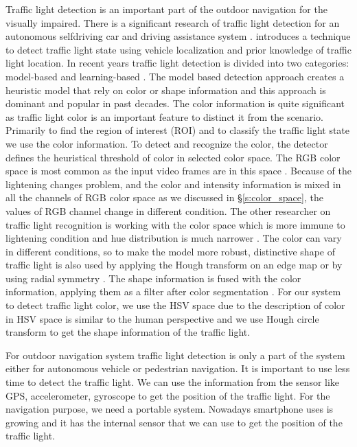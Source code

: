 Traffic light detection is an important part of the outdoor navigation for the visually impaired.
There is a significant research of traffic light detection for an autonomous selfdriving car and driving assistance system \cite{traffic_turan,selfdrive,traffic,traffic2,traffic3}.
\cite{traffic_turan} introduces a technique to detect traffic light state using vehicle localization and prior knowledge of traffic light location.
In recent years traffic light detection is divided into two categories: model-based and learning-based \cite{survey_traffic}.
The model based \cite{model,model2} detection approach creates a heuristic model that rely on color or shape information and this approach is dominant and popular in past decades.
The color information is quite significant as traffic light color is an important feature to distinct it from the scenario.
Primarily to find the region of interest (ROI) and to classify the traffic light state we use the color information.
To detect and recognize the color, the detector defines the heuristical threshold of color in selected color space.
The RGB color space is most common as the input video frames are in this space \cite{rgb2}.
Because of the lightening changes problem, and the color and intensity information is mixed in all the channels of  RGB color space as we discussed in \S\ref{s:color_space}, the values of RGB channel change in different condition.
The other researcher on traffic light recognition is working with the color space which is more immune to lightening condition and hue distribution is much narrower \cite{hsv2}.
The color can vary in different conditions, so to make the model more robust, distinctive shape of traffic light is also used by applying the Hough transform on an edge map \cite{hough,hough2,signalguru} or by using radial symmetry \cite{radial,radial2}.
The shape information is fused with the color information, applying them as a filter after color segmentation \cite{signalguru}.
For our system to detect traffic light color, we use the HSV space due to the description of color in HSV space is similar to the human perspective and we use Hough circle transform to get the shape information of the traffic light. 

For outdoor navigation system traffic light detection is only a part of the system either for autonomous vehicle or pedestrian navigation.
It is important to use less time to detect the traffic light.
We can use the information from the sensor like GPS, accelerometer, gyroscope to get the position of the traffic light. \cite{sensor,sensor2,sensor3}
For the navigation purpose, we need a portable system.
Nowadays smartphone uses is growing and it has the internal sensor that we can use to get the position of the traffic light.

